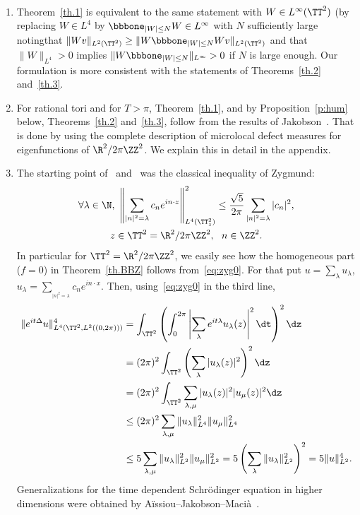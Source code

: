 \begin{remasc*}\ 
\begin{enumerate}
\item \label{rem1} Theorem~\ref{th.1} is equivalent to the same statement with $ W \in L^\infty (\TT^2)$ (by replacing $ W \in L^4 $ by $ \bbbone_{ |W | \leq N } W \in L^\infty $ with $ N$ sufficiently large noting\linebreak that $ \| W v \|_{ L^2 (\TT^2) } \geq \| W \bbbone_{ |W | \leq N } W v \|_{ L^2 (\TT^2) } $ and that $ \|W \|_{L^4} > 0 $ implies \linebreak$\| W \bbbone_{ |W | \leq N } \|_{L^\infty}> 0 $ if $ N $ is large enough. Our formulation is more consistent with the statements of Theorems~\ref{th.2} and~\ref{th.3}.

\item \label{rem2} For rational tori and for $ T > \pi $, Theorem~\ref{th.1}, and by Proposition~\ref{p:hum} below, Theorems~\ref{th.2} and~\ref{th.3}, follow from the results of Jakobson~\cite{Jak}. That is done by using the complete description of microlocal defect measures for eigenfunctions of $
\mathcal \R^2 / 2 \pi \ZZ^2 $. We explain this in detail in the appendix.

\item \label{rem3} The starting point of~\cite{Jak} and~\cite{BBZ} was the classical inequality of Zygmund:
\begin{multline}\label{eq:zyg0}
\forall \lambda \in \N,\ \left\| \sum_{{ |n|^2= \lambda}} c_ne^{in \cdot z} \right\|_{L^4(\TT^2_z)}^2 \leq \frac{\sqrt 5}{ 2 \pi}
\sum_{{ |n|^2= \lambda}} |c_n|^2, \\ z \in \TT^2 = \R^2 / 2 \pi \ZZ^2, \ \ n \in \ZZ^2.
\end{multline}
In particular for $ \TT^2 = \R^2/ 2 \pi \ZZ^2 $, we easily see how the homogeneous part ($f=0$) in Theorem~\ref{th.BBZ} follows from~\eqref{eq:zyg0}. For that put $ u = \sum_{\lambda } u_\lambda$, $ u_\lambda = \sum_{ _{ { |n|^2= \lambda}} } c_n e^{ i n \cdot x} $. Then, using~\eqref{eq:zyg0} in the third line,
\begin{align*}
\| e^{ it \Delta } u \|_{ L^4 (\TT^2, L^2 ((0, 2 \pi))) }^4 & =
\int_{ \TT^2 } \left(\int_{0}^{2\pi } \left| \sum_{ \lambda } e^{ it \lambda} u_\lambda (z) \right|^2 \dt \right)^2 \dz \\
& = (2 \pi)^2 \int_{ \TT^2 } \left(\sum_\lambda | u_\lambda (z) |^2 \right)^2 \dz \\
& = (2 \pi)^2\int_{\TT^2 } \sum_{ \lambda, \mu} |u_\lambda (z) |^2 |u_\mu (z) |^2 \dz \\
&\leq (2 \pi)^2\sum_{ \lambda, \mu } \| u_\lambda \|_{L^4}^2 \| u_\mu \|_{L^4}^2\\
& \leq 5 \sum_{ \lambda, \mu} \| u_\lambda \|_{L^2}^2 \| u_\mu \|_{L^2}^2 = 5 \left(\sum_\lambda \| u_\lambda \|_{L^2}^2 \right)^2 = 5 \| u \|_{L^2}^4.
\end{align*}
Generalizations for the time dependent Schrödinger equation in higher dimensions were obtained by Aïssiou--Jakobson--Macià~\cite{AJM}.


\end{enumerate}
\end{remasc*}
